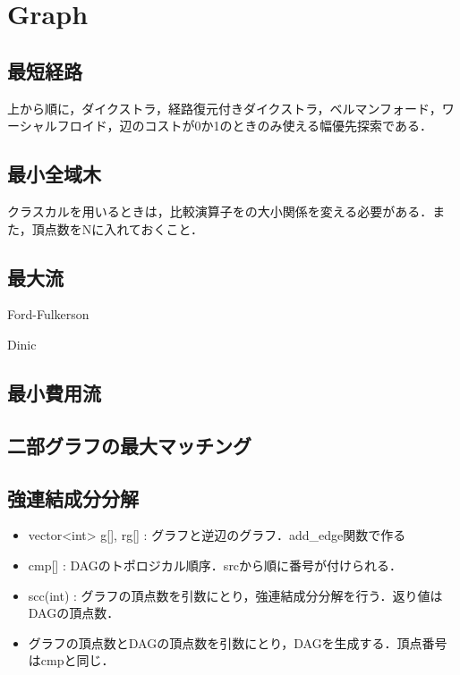\section{Graph}

\subsection{最短経路}
上から順に，ダイクストラ，経路復元付きダイクストラ，ベルマンフォード，ワーシャルフロイド，辺のコストが0か1のときのみ使える幅優先探索である．


\subsection{最小全域木}
クラスカルを用いるときは，比較演算子をの大小関係を変える必要がある．また，頂点数をNに入れておくこと．


\subsection{最大流}
Ford-Fulkerson

Dinic


\subsection{最小費用流}


\subsection{二部グラフの最大マッチング}


\subsection{強連結成分分解}
\begin{itemize}
  \item vector<int> g[], rg[] : グラフと逆辺のグラフ．add_edge関数で作る
  \item cmp[] : DAGのトポロジカル順序．srcから順に番号が付けられる．
  \item scc(int) : グラフの頂点数を引数にとり，強連結成分分解を行う．返り値はDAGの頂点数．
  \item グラフの頂点数とDAGの頂点数を引数にとり，DAGを生成する．頂点番号はcmpと同じ．
\end{itemize}


